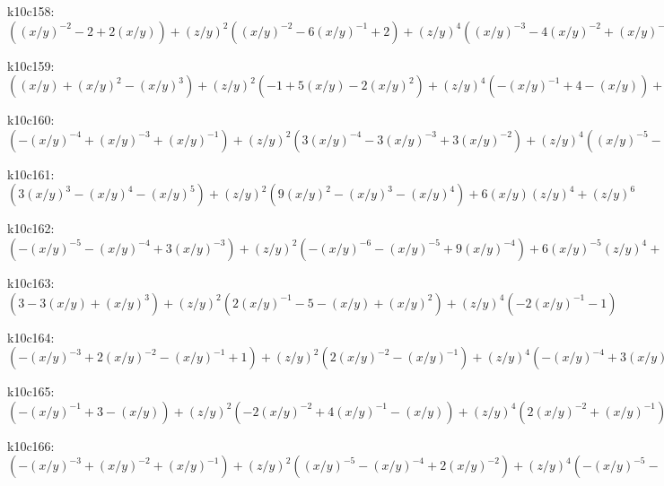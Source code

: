 k10c158: $ ((x/y)^{-2}-2+2(x/y))  +(z/y)^{2}((x/y)^{-2}-6(x/y)^{-1}+2)  +(z/y)^{4}((x/y)^{-3}-4(x/y)^{-2}+(x/y)^{-1})  -(x/y)^{-3}(z/y)^{6} $ 

k10c159: $ ((x/y)+(x/y)^{2}-(x/y)^{3})  +(z/y)^{2}(-1+5(x/y)-2(x/y)^{2})  +(z/y)^{4}(-(x/y)^{-1}+4-(x/y))  +(x/y)^{-1}(z/y)^{6} $ 

k10c160: $ (-(x/y)^{-4}+(x/y)^{-3}+(x/y)^{-1})  +(z/y)^{2}(3(x/y)^{-4}-3(x/y)^{-3}+3(x/y)^{-2})  +(z/y)^{4}((x/y)^{-5}-4(x/y)^{-4}+(x/y)^{-3})  -(x/y)^{-5}(z/y)^{6} $ 

k10c161: $ (3(x/y)^{3}-(x/y)^{4}-(x/y)^{5})  +(z/y)^{2}(9(x/y)^{2}-(x/y)^{3}-(x/y)^{4})  +6(x/y)(z/y)^{4}  +(z/y)^{6} $ 

k10c162: $ (-(x/y)^{-5}-(x/y)^{-4}+3(x/y)^{-3})  +(z/y)^{2}(-(x/y)^{-6}-(x/y)^{-5}+9(x/y)^{-4})  +6(x/y)^{-5}(z/y)^{4}  +(x/y)^{-6}(z/y)^{6} $ 

k10c163: $ (3-3(x/y)+(x/y)^{3})  +(z/y)^{2}(2(x/y)^{-1}-5-(x/y)+(x/y)^{2})  +(z/y)^{4}(-2(x/y)^{-1}-1) $ 

k10c164: $ (-(x/y)^{-3}+2(x/y)^{-2}-(x/y)^{-1}+1)  +(z/y)^{2}(2(x/y)^{-2}-(x/y)^{-1})  +(z/y)^{4}(-(x/y)^{-4}+3(x/y)^{-3}-(x/y)^{-2})  +(x/y)^{-4}(z/y)^{6} $ 

k10c165: $ (-(x/y)^{-1}+3-(x/y))  +(z/y)^{2}(-2(x/y)^{-2}+4(x/y)^{-1}-(x/y))  +(z/y)^{4}(2(x/y)^{-2}+(x/y)^{-1}) $ 

k10c166: $ (-(x/y)^{-3}+(x/y)^{-2}+(x/y)^{-1})  +(z/y)^{2}((x/y)^{-5}-(x/y)^{-4}+2(x/y)^{-2})  +(z/y)^{4}(-(x/y)^{-5}-(x/y)^{-4}) $ 

